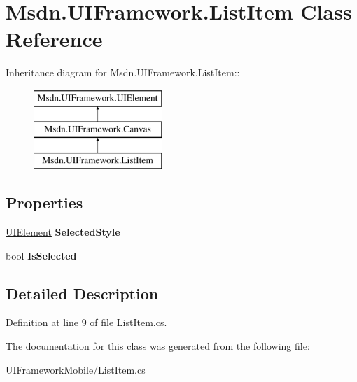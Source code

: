 \hypertarget{class_msdn_1_1_u_i_framework_1_1_list_item}{
\section{Msdn.UIFramework.ListItem Class Reference}
\label{class_msdn_1_1_u_i_framework_1_1_list_item}
}
Inheritance diagram for Msdn.UIFramework.ListItem::\begin{figure}[H]
\begin{center}
\leavevmode
\includegraphics[height=3cm]{class_msdn_1_1_u_i_framework_1_1_list_item}
\end{center}
\end{figure}
\subsection*{Properties}
\begin{DoxyCompactItemize}
\item 
\hypertarget{class_msdn_1_1_u_i_framework_1_1_list_item_a47031ae7ff50ae259815ad5649b1a362}{
\hyperlink{class_msdn_1_1_u_i_framework_1_1_u_i_element}{UIElement} {\bfseries SelectedStyle}}
\label{class_msdn_1_1_u_i_framework_1_1_list_item_a47031ae7ff50ae259815ad5649b1a362}

\item 
\hypertarget{class_msdn_1_1_u_i_framework_1_1_list_item_a0fa4c6bc07e96a00e7dc5b9c19bd4721}{
bool {\bfseries IsSelected}}
\label{class_msdn_1_1_u_i_framework_1_1_list_item_a0fa4c6bc07e96a00e7dc5b9c19bd4721}

\end{DoxyCompactItemize}


\subsection{Detailed Description}


Definition at line 9 of file ListItem.cs.

The documentation for this class was generated from the following file:\begin{DoxyCompactItemize}
\item 
UIFrameworkMobile/ListItem.cs\end{DoxyCompactItemize}
